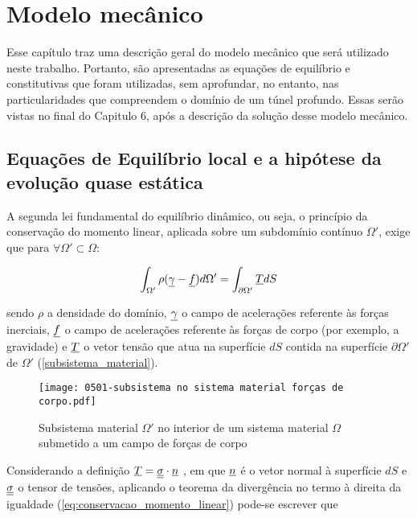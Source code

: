 \chapter{Modelo mecânico}

Esse capítulo traz uma descrição geral do modelo mecânico que será utilizado neste trabalho. Portanto, são apresentadas as equações de equilíbrio e constitutivas que foram utilizadas, sem aprofundar, no entanto, nas particularidades que compreendem o domínio de um túnel profundo. Essas serão vistas no final do Capitulo 6, após a descrição da solução desse modelo mecânico. 

\section{Equações de Equilíbrio local e a hipótese da evolução quase estática}

A segunda lei fundamental do equilíbrio dinâmico, ou seja, o princípio da conservação do momento linear, aplicada sobre um subdomínio contínuo $\Omega'$, exige que para $\forall \Omega' \subset \Omega$:

\begin{equation}
	\label{eq:conservacao_momento_linear}
\int_{\Omega'}\rho(\underline \gamma-\underline f)d\Omega' = \int_{\partial\Omega'}\underline T dS
\end{equation}

sendo $\rho$ a densidade do domínio, $\underline \gamma$ o campo de acelerações referente às forças inerciais, $\underline f$ o campo de acelerações referente às forças de corpo (por exemplo, a gravidade) e $\underline T$ o vetor tensão que atua na superfície $dS$ contida na superfície $\partial\Omega'$ de $\Omega'$ (\autoref{subsistema_material}).
%
\begin{figure}[H]
	\begin{center}
		\texttt{[image: 0501-subsistema no sistema material forças de corpo.pdf]}
	\end{center}
	\caption{\label{subsistema_material}Subsistema material $\Omega'$ no interior de um sistema material $\Omega$ submetido a um campo de forças de corpo}
\end{figure}

Considerando a definição $\underline T = \underline{\underline \sigma} \cdot \underline n$ , em que $\underline n$ é o vetor normal à superfície $dS$ e $\underline{\underline \sigma}$ o tensor de tensões, aplicando o teorema da divergência no termo à direita da igualdade (\ref{eq:conservacao_momento_linear}) pode-se escrever que

